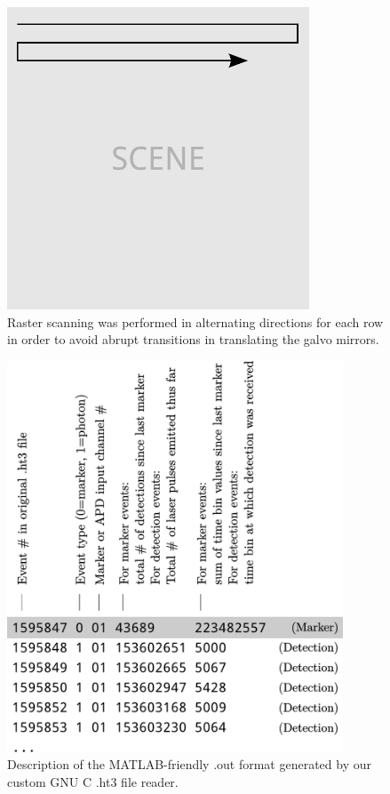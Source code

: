 \begin{figure}[htb]
\centerline{\includegraphics[width=9cm]{figure-first-scanning.pdf}}
\caption{Raster scanning was performed in alternating directions for each row in order to avoid abrupt transitions in translating the galvo mirrors.}
\label{figure:first-scanning}
\end{figure}

\begin{figure}[htb]
\centerline{\includegraphics[width=10cm]{figure-first-outformat.pdf}}
\caption{Description of the MATLAB-friendly .out format generated by our custom GNU C .ht3 file reader.}
\label{figure:first-outformat}
\end{figure}

